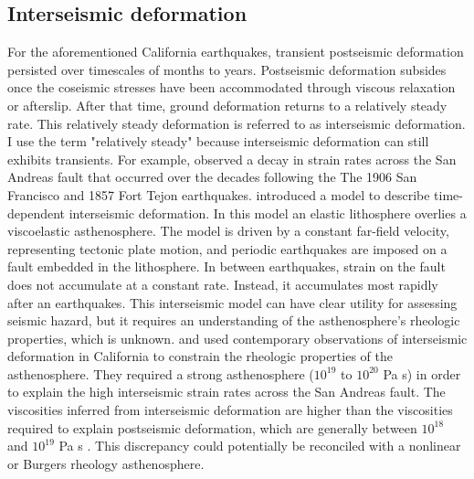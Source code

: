 \subsection{Interseismic deformation} 
For the aforementioned California earthquakes, transient postseismic
deformation persisted over timescales of months to years. Postseismic
deformation subsides once the coseismic stresses have been accommodated
through viscous relaxation or afterslip. After that time, ground
deformation returns to a relatively steady rate. This relatively
steady deformation is referred to as interseismic deformation. I use
the term "relatively steady" because interseismic deformation can
still exhibits transients. For example, \citet{Thatcher1983} observed
a decay in strain rates across the San Andreas fault that occurred
over the decades following the The 1906 San Francisco and 1857 Fort
Tejon earthquakes. \citet{Savage1978} introduced a model to describe
time-dependent interseismic deformation. In this model an elastic
lithosphere overlies a viscoelastic asthenosphere. The model is driven
by a constant far-field velocity, representing tectonic plate motion,
and periodic earthquakes are imposed on a fault embedded in the
lithosphere. In between earthquakes, strain on the fault does not
accumulate at a constant rate. Instead, it accumulates most rapidly
after an earthquakes. This interseismic model can have clear utility
for assessing seismic hazard, but it requires an understanding of the
asthenosphere's rheologic properties, which is unknown.
\citet{Segall2002} and \citet{Johnson2004} used contemporary
observations of interseismic deformation in California to constrain
the rheologic properties of the asthenosphere. They required a strong
asthenosphere ($10^{19}$ to $10^{20}$ Pa s) in order to explain the
high interseismic strain rates across the San Andreas fault. The
viscosities inferred from interseismic deformation are higher than the
viscosities required to explain postseismic deformation, which are
generally between $10^{18}$ and $10^{19}$ Pa s \citep{Thatcher2008}.
This discrepancy could potentially be reconciled with a nonlinear
\citep{Freed2004} or Burgers \citep{Pollitz2003} rheology
asthenosphere.

